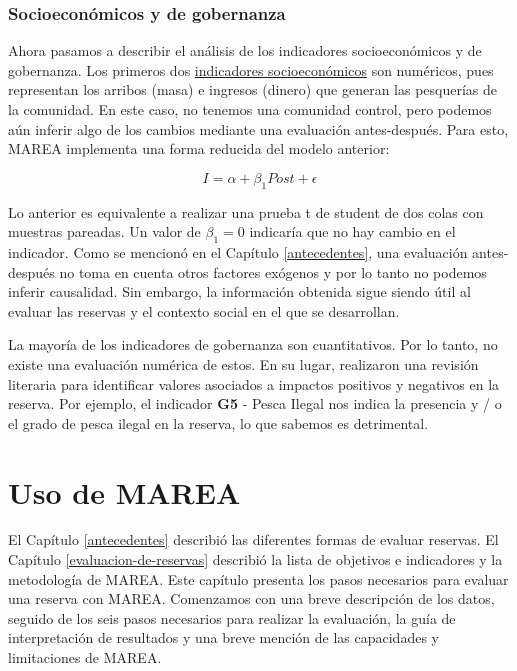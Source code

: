 \documentclass[]{krantz}
\begin{document}
\hypertarget{socioeconomicos-y-de-gobernanza}{%
\subsection{Socioeconómicos y de
gobernanza}\label{socioeconomicos-y-de-gobernanza}}

Ahora pasamos a describir el análisis de los indicadores socioeconómicos
y de gobernanza. Los primeros dos
\protect\hyperlink{objetivos-e-indicadores}{indicadores socioeconómicos}
son numéricos, pues representan los arribos (masa) e ingresos (dinero)
que generan las pesquerías de la comunidad. En este caso, no tenemos una
comunidad control, pero podemos aún inferir algo de los cambios mediante
una evaluación antes-después. Para esto, MAREA implementa una forma
reducida del modelo anterior:

\[
I = \alpha + \beta_1Post + \epsilon
\]

Lo anterior es equivalente a realizar una prueba t de student de dos
colas con muestras pareadas. Un valor de \(\beta_1 = 0\) indicaría que
no hay cambio en el indicador. Como se mencionó en el Capítulo
\ref{antecedentes}, una evaluación antes-después no toma en cuenta otros
factores exógenos y por lo tanto no podemos inferir causalidad. Sin
embargo, la información obtenida sigue siendo útil al evaluar las
reservas y el contexto social en el que se desarrollan.

La mayoría de los indicadores de gobernanza son cuantitativos. Por lo
tanto, no existe una evaluación numérica de estos. En su lugar,
\citet{villasenorderbez_2018} realizaron una revisión literaria para
identificar valores asociados a impactos positivos y negativos en la
reserva. Por ejemplo, el indicador \textbf{G5} - Pesca Ilegal nos indica
la presencia y / o el grado de pesca ilegal en la reserva, lo que
sabemos es detrimental.

\hypertarget{uso-de-marea}{%
\chapter{Uso de MAREA}\label{uso-de-marea}}

El Capítulo \ref{antecedentes} describió las diferentes formas de
evaluar reservas. El Capítulo \ref{evaluacion-de-reservas} describió la
lista de objetivos e indicadores y la metodología de MAREA. Este
capítulo presenta los pasos necesarios para evaluar una reserva con
MAREA. Comenzamos con una breve descripción de los datos, seguido de los
seis pasos necesarios para realizar la evaluación, la guía de
interpretación de resultados y una breve mención de las capacidades y
limitaciones de MAREA.
\end{document}
